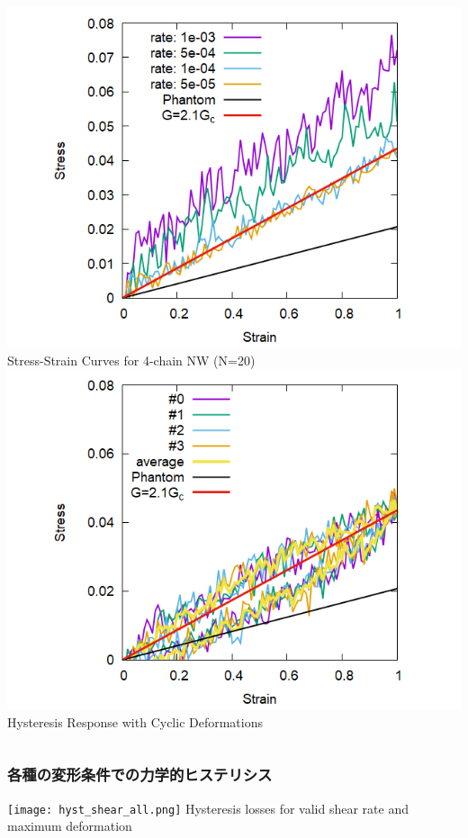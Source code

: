 \documentclass[12pt, dvipdfmx]{beamer}
\begin{document}
\begin{frame}
	\begin{columns}[totalwidth=\linewidth]
			\centering
				\includegraphics[width=\textwidth]{Shear_Random_4chain_N20.png}
				Stress-Strain Curves for 4-chain NW (N=20)
			\centering
				\includegraphics[width=\textwidth]{CyclicDeform_4chain_rate_2e-4.png}
				Hysteresis Response with Cyclic Deformations
		\end{columns}
\end{frame}


\begin{frame}
	\frametitle{各種の変形条件での力学的ヒステリシス}
		\centering
			\texttt{[image: hyst\_shear\_all.png]}
			Hysteresis losses for valid shear rate and maximum deformation
\end{frame}
\end{document}
